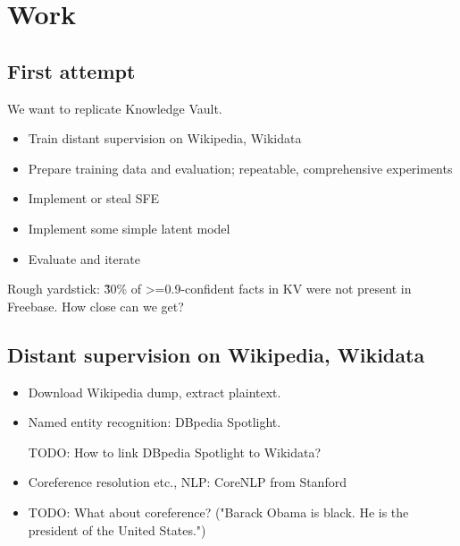 \chapter{Work}

\section{First attempt}

We want to replicate Knowledge Vault.
\begin{itemize}
\item Train distant supervision on Wikipedia, Wikidata
\item Prepare training data and evaluation; repeatable, comprehensive
experiments
\item Implement or steal SFE
\item Implement some simple latent model
\item Evaluate and iterate
\end{itemize}
Rough yardstick: \~30\% of >=0.9-confident facts in KV were not present in
Freebase. How close can we get?

\section{Distant supervision on Wikipedia, Wikidata}

\begin{itemize}
\item Download Wikipedia dump, extract plaintext.
\item Named entity recognition: DBpedia Spotlight\cite{dbpedia-spotlight}.

	TODO: How to link DBpedia Spotlight to Wikidata?

\item Coreference resolution etc., NLP: CoreNLP from Stanford\cite{stanford-corenlp}

\item TODO: What about coreference? ("Barack Obama is black. He is the
president of the United States.")
\end{itemize}
